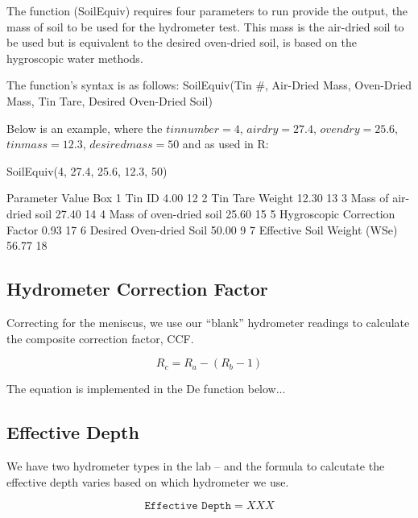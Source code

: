 \documentclass{tufte-handout}
\begin{document}
The function (SoilEquiv) requires four parameters to run provide the output, the mass of soil to be used for the hydrometer test. This mass is the air-dried soil to be used but is equivalent to the desired oven-dried soil, is based on the hygroscopic water methods. 

The function's syntax is as follows: SoilEquiv(Tin \#, Air-Dried Mass, Oven-Dried Mass, Tin Tare, Desired Oven-Dried Soil)

Below is an example, where the $tin number = 4$, $airdry = 27.4$, $ovendry = 25.6$, $tinmass = 12.3$, $desiredmass = 50$ and as used in R: 

\begin{Schunk}
\begin{Sinput}
 SoilEquiv(4, 27.4, 25.6, 12.3, 50)
\end{Sinput}
\begin{Soutput}
                      Parameter Value Box
1                        Tin ID  4.00  12
2               Tin Tare Weight 12.30  13
3        Mass of air-dried soil 27.40  14
4       Mass of oven-dried soil 25.60  15
5 Hygroscopic Correction Factor  0.93  17
6       Desired Oven-dried Soil 50.00   9
7   Effective Soil Weight (WSe) 56.77  18
\end{Soutput}
\end{Schunk}


\subsection{Hydrometer Correction Factor}

Correcting for the meniscus, we use our ``blank'' hydrometer readings to calculate the composite correction factor, CCF. 

\begin{equation}
R_c = R_a - (R_b - 1)
\end{equation}

The equation is implemented in the De function below...



\subsection{Effective Depth}

We have two hydrometer types in the lab -- and the formula to calcutate the effective depth varies based on which hydrometer we use. 

\begin{equation}
\texttt{Effective Depth} = XXX
\end{equation}
\end{document}
